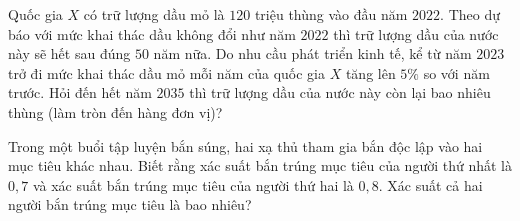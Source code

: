 \begin{bt}%
	Quốc gia $X$ có trữ lượng dầu mỏ là $120$ triệu thùng vào đầu năm $2022$. Theo dự báo với mức khai thác dầu không đổi như năm $2022$ thì trữ lượng dầu của nước này sẽ hết sau đúng $50$ năm nữa. Do nhu cầu phát triển kinh tế, kể từ năm $2023$ trở đi mức khai thác dầu mỏ mỗi năm của quốc gia $X$ tăng lên $5 \%$ so với năm trước. Hỏi đến hết năm $2035$ thì trữ lượng dầu của nước này còn lại bao nhiêu thùng (làm tròn đến hàng đơn vị)?
\end{bt}

\begin{bt}%
	Trong một buổi tập luyện bắn súng, hai xạ thủ tham gia bắn độc lập vào hai mục tiêu khác nhau. Biết rằng xác suất bắn trúng mục tiêu của người thứ nhất là $0{,}7$ và xác suất bắn trúng mục tiêu của người thứ hai là $0{,}8$. Xác suất cả hai người bắn trúng mục tiêu là bao nhiêu?
\end{bt}

